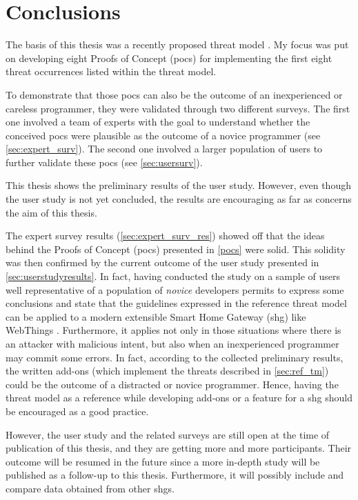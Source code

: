 \chapter{Conclusions}
\label{conclusions}

The basis of this thesis was a recently proposed threat model \cite{corno2022threat}. My focus was put on developing eight Proofs of Concept (\glspl{poc}) for implementing the first eight threat occurrences listed within the threat model.

To demonstrate that those \glspl{poc} can also be the outcome of an inexperienced or careless programmer, they were validated through two different surveys. The first one involved a team of experts with the goal to understand whether the conceived \glspl{poc} were plausible as the outcome of a novice programmer (see \autoref{sec:expert_surv}). The second one involved a larger population of users to further validate these \glspl{poc} (see \autoref{sec:usersurv}). 

This thesis shows the preliminary results of the user study. However, even though the user study is not yet concluded, the results are encouraging as far as concerns the aim of this thesis.

The expert survey results (\autoref{sec:expert_surv_res}) showed off that the ideas behind the Proofs of Concept (\glspl{poc}) presented in \autoref{pocs} were solid. This solidity was then confirmed by the current outcome of the user study presented in \autoref{sec:userstudyresults}. In fact, having conducted the study on a sample of users well representative of a population of \textit{novice} developers permits
to express some conclusions and state that the guidelines expressed in the reference threat model \cite{corno2022threat} can be applied to a modern extensible Smart Home Gateway (\gls{shg}) like WebThings \cite{wtabout}. Furthermore, it applies not only in those situations where there is an attacker with malicious intent, but also when an inexperienced programmer may commit some errors. In fact, according to the collected preliminary results, the written add-ons (which implement the threats described in \autoref{sec:ref_tm}) could be the outcome of a distracted or novice programmer. Hence, having the threat model as a reference while developing add-ons or a feature for a \gls{shg} should be encouraged as a good practice.

However, the user study and the related surveys are still open at the time of publication of this thesis, and they are getting more and more participants. Their outcome will be resumed in the future since a more in-depth study will be published as a follow-up to this thesis. Furthermore, it will possibly include and compare data obtained from other \glspl{shg}.


